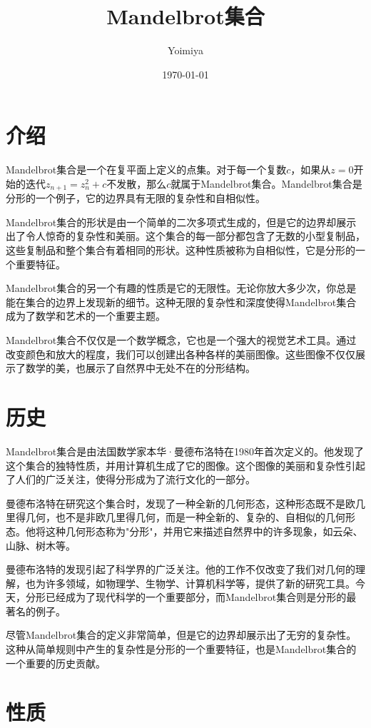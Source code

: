 \documentclass{ctexart}
\title{Mandelbrot集合}
\author{Yoimiya}
\date{\today}
\begin{document}
\maketitle

\section{介绍}

Mandelbrot集合是一个在复平面上定义的点集。对于每一个复数$c$，如果从$z=0$开始的迭代$z_{n+1} = z_n^2 + c$不发散，那么$c$就属于Mandelbrot集合。Mandelbrot集合是分形的一个例子，它的边界具有无限的复杂性和自相似性。

Mandelbrot集合的形状是由一个简单的二次多项式生成的，但是它的边界却展示出了令人惊奇的复杂性和美丽。这个集合的每一部分都包含了无数的小型复制品，这些复制品和整个集合有着相同的形状。这种性质被称为自相似性，它是分形的一个重要特征。

Mandelbrot集合的另一个有趣的性质是它的无限性。无论你放大多少次，你总是能在集合的边界上发现新的细节。这种无限的复杂性和深度使得Mandelbrot集合成为了数学和艺术的一个重要主题。

Mandelbrot集合不仅仅是一个数学概念，它也是一个强大的视觉艺术工具。通过改变颜色和放大的程度，我们可以创建出各种各样的美丽图像。这些图像不仅仅展示了数学的美，也展示了自然界中无处不在的分形结构。

\section{历史}

Mandelbrot集合是由法国数学家本华·曼德布洛特在1980年首次定义的。他发现了这个集合的独特性质，并用计算机生成了它的图像。这个图像的美丽和复杂性引起了人们的广泛关注，使得分形成为了流行文化的一部分。

曼德布洛特在研究这个集合时，发现了一种全新的几何形态，这种形态既不是欧几里得几何，也不是非欧几里得几何，而是一种全新的、复杂的、自相似的几何形态。他将这种几何形态称为"分形"，并用它来描述自然界中的许多现象，如云朵、山脉、树木等。

曼德布洛特的发现引起了科学界的广泛关注。他的工作不仅改变了我们对几何的理解，也为许多领域，如物理学、生物学、计算机科学等，提供了新的研究工具。今天，分形已经成为了现代科学的一个重要部分，而Mandelbrot集合则是分形的最著名的例子。

尽管Mandelbrot集合的定义非常简单，但是它的边界却展示出了无穷的复杂性。这种从简单规则中产生的复杂性是分形的一个重要特征，也是Mandelbrot集合的一个重要的历史贡献。

\section{性质}
\end{document}
